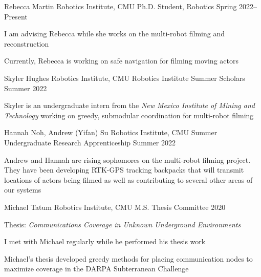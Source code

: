 
\begin{cventries}
  \cventry
  {Rebecca Martin}
  {Robotics Institute, CMU}
  {Ph.D. Student, Robotics}
  {Spring 2022--Present}
  {
    \begin{cvitems}
      \item I am advising Rebecca while she works on the multi-robot filming and
        reconstruction
      \item Currently, Rebecca is working on safe navigation for filming moving
        actors
    \end{cvitems}
  }
  \cventry
  {Skyler Hughes}
  {Robotics Institute, CMU}
  {Robotics Institute Summer Scholars}
  {Summer 2022}
  {
    \begin{cvitems}
      \item Skyler is an undergraduate intern from the
        \emph{New Mexico Institute of Mining and Technology}
        working on greedy, submodular coordination for multi-robot filming
    \end{cvitems}
  }
  \cventry
  {Hannah Noh, Andrew (Yifan) Su}
  {Robotics Institute, CMU}
  {Summer Undergraduate Research Apprenticeship}
  {Summer 2022}
  {
    \begin{cvitems}
    \item Andrew and Hannah are rising sophomores on the multi-robot filming
      project.
      They have been developing RTK-GPS tracking backpacks that will transmit
      locations of actors being filmed as well as contributing to several other
      areas of our systems
    \end{cvitems}
  }
  \cventry
  {Michael Tatum}
  {Robotics Institute, CMU}
  {M.S. Thesis Committee}
  {2020}
  {
    \begin{cvitems}
      \item Thesis: \emph{Communications Coverage in Unknown Underground Environments}
      \item I met with Michael regularly while he performed his thesis work
      \item Michael's thesis developed greedy methods for placing communication
        nodes to maximize coverage in the DARPA Subterranean Challenge
    \end{cvitems}
  }
\end{cventries}
